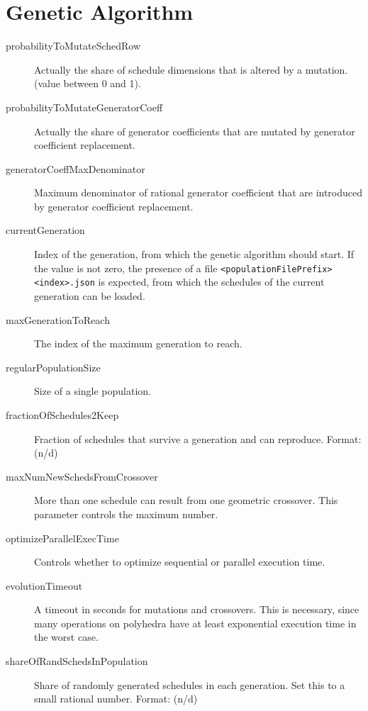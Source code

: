 \documentclass{article}
\begin{document}
\section{Genetic Algorithm}
\begin{description}
  \item[probabilityToMutateSchedRow] Actually the share of schedule
    dimensions that is altered by a mutation. (value between 0 and 1).
  \item[probabilityToMutateGeneratorCoeff] Actually the share of
    generator coefficients that are mutated by generator coefficient
    replacement.

  \item[generatorCoeffMaxDenominator] Maximum denominator of rational
    generator coefficient that are introduced by generator coefficient
    replacement.
  \item[currentGeneration] Index of the generation, from which the
    genetic algorithm should start. If the value is not zero, the presence of
    a file \texttt{<populationFilePrefix><index>.json} is expected, from which
    the schedules of the current generation can be loaded.

  \item[maxGenerationToReach] The index of the maximum generation to
    reach.
  \item[regularPopulationSize] Size of a single population.
  \item[fractionOfSchedules2Keep] Fraction of schedules that survive
    a generation and can reproduce. Format: (n/d)
  \item[maxNumNewSchedsFromCrossover] More than one schedule can
    result from one geometric crossover. This parameter controls the maximum
    number.
  \item[optimizeParallelExecTime] Controls whether to optimize
    sequential or parallel execution time.
  \item[evolutionTimeout] A timeout in seconds for mutations and
    crossovers. This is necessary, since many operations on polyhedra have at
    least exponential execution time in the worst case.
  \item[shareOfRandSchedsInPopulation] Share of randomly generated
    schedules in each generation. Set this to a small rational number. Format:
    (n/d)


\end{description}
\end{document}
